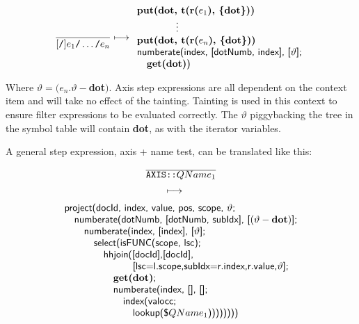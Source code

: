 \begin{equation}
\frac{}{[\mbox{\texttt{/}}]e_1\mbox{\texttt{/}}\ldots\mbox{\texttt{/}}e_n} \longmapsto
\begin{array}{l}
\mbox{\textbf{put(dot, t(r(}}e_1\mbox{\textbf{), \{dot\}))}} \\
\qquad \qquad \vdots \\
\mbox{\textbf{put(dot, t(r(}}e_n\mbox{\textbf{), \{dot\}))}} \\
\mbox{\textsf{numberate(index, [dotNumb, index], [}}\vartheta\mbox{\textsf{];}} \\ \quad
\mbox{\textbf{get(dot)}\textsf{)}}
\end{array}
\label{rule:trans:TD:pathExpr}
\end{equation} 

Where $\vartheta = (e_n.\vartheta-$\textbf{dot}$)$. Axis step expressions are all dependent on the context item and
will take no effect of the tainting. Tainting is used in this context to ensure filter expressions to be evaluated
correctly. The $\vartheta$ piggybacking the tree in the symbol table will contain \textbf{dot}, as with
the iterator variables.

A general step expression, axis + name test, can be translated like this:
\begin{equation}
\begin{array}{c}
\frac{}{\displaystyle \texttt{AXIS::}QName_1} \\ 
\longmapsto \begin{array}{c}\mbox{\tiny } \\ \mbox{\tiny } \end{array} \\
\begin{array}{l}
\mbox{\textsf{project(docId, index, value, pos, scope, }}\vartheta\mbox{\textsf{;}} \\ \quad
\mbox{\textsf{numberate(dotNumb, [dotNumb, subIdx], [}}(\vartheta-\mbox{\textbf{dot}})\mbox{\textsf{];}} \\
\quad\quad 
\mbox{\textsf{numberate(index, [index], [}}\vartheta\mbox{\textsf{];}} \\ \quad\quad\quad
\mbox{\textsf{select(isFUNC(scope, lsc);}} \\ \quad \quad\quad\quad
\mbox{\textsf{hhjoin([docId],[docId],}} \\ \quad\quad\quad\quad\quad\quad\quad
\mbox{\textsf{[lsc=l.scope,subIdx=r.index,r.value,}}\vartheta\mbox{\textsf{];}}\\
\quad\quad\quad\quad\quad \mbox{\textbf{get(dot)}\textsf{;}} \\ \quad \quad\quad \quad\quad
\mbox{\textsf{numberate(index, [], [];}}\\ \quad\quad\quad\quad\quad\quad
\mbox{\textsf{index(valocc;}} \\ \quad\quad\quad\quad\quad\quad\quad
\mbox{\textsf{lookup(\$}}QName_1\mbox{\textsf{))))))))}}
\end{array}
\end{array}
\label{rule:trans:TD:pathStep}
\end{equation}

